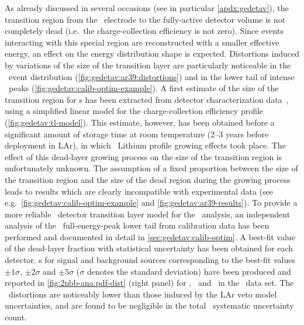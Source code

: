 \begin{description}[wide]
  \item[Transition layer model] As already discussed in several occasions (see in
    particular \cref{apdx:gedetav}), the transition region from the \nplus\ electrode to
    the fully-active detector volume is not completely dead (i.e.~the charge-collection
    efficiency is not zero). Since events interacting with this special region are
    reconstructed with a smaller effective energy, an effect on the energy distribution
    shape is expected. Distortions induced by variations of the size of the transition
    layer are particularly noticeable in the \Arl\ event distribution
    (\cref{fig:gedetav:ar39:distortions}) and in the lower tail of intense \g\ peaks
    (\cref{fig:gedetav:calib-optim-example}). A first estimate of the size of the
    transition region for \bege{}s has been extracted from detector characterization
    data~\cite{Lehnert2016}, using a simplified linear model for the charge-collection
    efficiency profile (\cref{fig:gedetav:tl-model}). This estimate, however, has been
    obtained before a significant amount of storage time at room temperature (2--3 years
    before deployment in LAr), in which \nplus\ Lithium profile growing effects took
    place. The effect of this dead-layer growing process on the size of the transition
    region is unfortunately unknown. The assumption of a fixed proportion between the size
    of the transition region and the size of the dead region during the growing process
    leads to results which are clearly incompatible with experimental data (see
    e.g.~\cref{fig:gedetav:calib-optim-example} and \cref{fig:gedetav:ar39-results}).
    \newpar
    To provide a more reliable \bege\ detector transition layer model for the \nnbb\
    analysis, an independent analysis of the \Th\ full-energy-peak lower tail from
    calibration data has been performed and documented in detail in
    \cref{sec:gedetav:calib-optim}. A best-fit value of the dead-layer fraction with
    statistical uncertainty has been obtained for each detector. \pdf{}s for signal and
    background sources corresponding to the best-fit values $\pm1\sigma$, $\pm2\sigma$ and
    $\pm5\sigma$ ($\sigma$ denotes the standard deviation) have been produced and
    reported in \cref{fig:2nbb-ana:pdf-dist} (right panel) for \kvn, \kvz\ and \nnbb\ in
    the \enrBEGeII\ data set. The \pdf\ distortions are noticeably lower than those induced
    by the LAr veto model uncertainties, and are found to be negligible in the total
    \thalftwo\ systematic uncertainty count.


\end{description}
